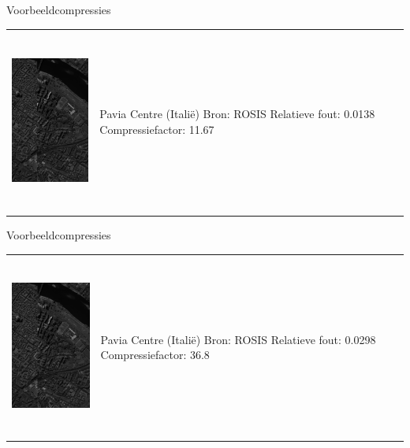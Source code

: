 \documentclass[t,12pt,dutch
\ifx\beamermode\undefined\else,\beamermode\fi
]{beamer}
\begin{document}
\begin{frame}{Voorbeeldcompressies}

\begin{table}[H]
\centering
\begin{tabular}{C{0.6\textwidth}  L{0.4\textwidth}}
\includegraphics[height=6cm]{images/example_compression_Pavia_Centre_0_01.png}
&
Pavia Centre (Itali\"e)\newline
Bron: ROSIS\newline
\vspace{5mm}
Relatieve fout: 0.0138
Compressiefactor: 11.67
\end{tabular}
\end{table}

\end{frame}

\begin{frame}{Voorbeeldcompressies}

\begin{table}[H]
\centering
\begin{tabular}{C{0.6\textwidth}  L{0.4\textwidth}}
\includegraphics[height=6cm]{images/example_compression_Pavia_Centre_0_025.png}
&
Pavia Centre (Itali\"e)\newline
Bron: ROSIS\newline
\vspace{5mm}
Relatieve fout: 0.0298
Compressiefactor: 36.8
\end{tabular}
\end{table}

\end{frame}
\end{document}
